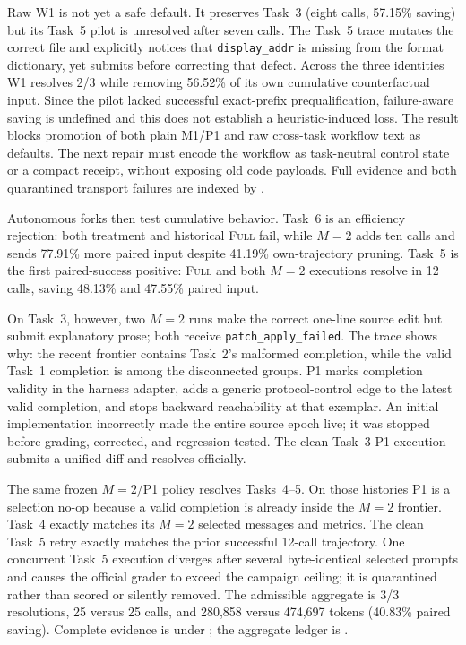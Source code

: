 \documentclass[11pt]{article}
\begin{document}
Raw W1 is not yet a safe default.  It preserves Task~3 (eight calls, 57.15\%
saving) but its Task~5 pilot is unresolved after seven calls.  The Task~5 trace mutates the correct
file and explicitly notices that \texttt{display\_addr} is missing from the
format dictionary, yet submits before correcting that defect.  Across the
three identities W1 resolves 2/3 while removing 56.52\% of its own cumulative
counterfactual input.  Since the pilot lacked successful exact-prefix
prequalification, failure-aware saving is undefined and this does not establish
a heuristic-induced loss.  The result blocks promotion of both plain M1/P1 and
raw cross-task workflow text as defaults.  The next repair
must encode the workflow as task-neutral control state or a compact receipt,
without exposing old code payloads.  Full evidence and both quarantined
transport failures are indexed by
.

Autonomous forks then test cumulative behavior.  Task~6 is an efficiency
rejection: both treatment and historical \textsc{Full} fail, while $M=2$ adds
ten calls and sends 77.91\% more paired input despite 41.19\% own-trajectory
pruning.  Task~5 is the first paired-success positive: \textsc{Full} and both
$M=2$ executions resolve in 12 calls, saving 48.13\% and 47.55\% paired input.

On Task~3, however, two $M=2$ runs make the correct one-line source edit but
submit explanatory prose; both receive \texttt{patch\_apply\_failed}.  The
trace shows why: the recent frontier contains Task~2's malformed completion,
while the valid Task~1 completion is among the disconnected groups.  P1 marks
completion validity in the harness adapter, adds a generic protocol-control
edge to the latest valid completion, and stops backward reachability at that
exemplar.  An initial implementation incorrectly made the entire source epoch
live; it was stopped before grading, corrected, and regression-tested.  The
clean Task~3 P1 execution submits a unified diff and resolves officially.

The same frozen $M=2$/P1 policy resolves Tasks~4--5.  On those histories P1 is
a selection no-op because a valid completion is already inside the $M=2$
frontier.  Task~4 exactly matches its $M=2$ selected messages and metrics.
The clean Task~5 retry exactly matches the prior successful 12-call trajectory.
One concurrent Task~5 execution diverges after several byte-identical selected
prompts and causes the official grader to exceed the campaign ceiling; it is
quarantined rather than scored or silently removed.  The admissible aggregate
is 3/3 resolutions, 25 versus 25 calls, and 280,858 versus 474,697 tokens
(40.83\% paired saving).  Complete evidence is under
; the aggregate ledger is
.
\end{document}
